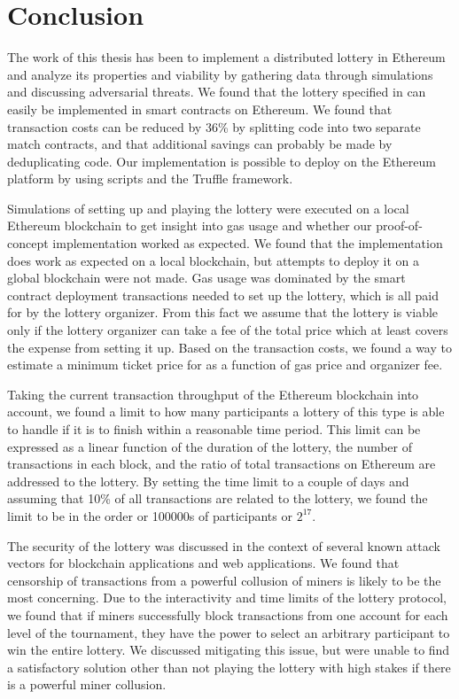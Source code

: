 \chapter{Conclusion}
\label{chap:conclusion}


The work of this thesis has been to implement a distributed lottery in Ethereum and analyze its properties and viability by gathering data through simulations and discussing adversarial threats. We found that the lottery specified in \cite{miller_zero-collateral_2017} can easily be implemented in smart contracts on Ethereum. We found that transaction costs can be reduced by 36\% by splitting code into two separate match contracts, and that additional savings can probably be made by deduplicating code. Our implementation is possible to deploy on the Ethereum platform by using scripts and the Truffle framework.

Simulations of setting up and playing the lottery were executed on a local Ethereum blockchain to get insight into gas usage and whether our proof-of-concept implementation worked as expected. We found that the implementation does work as expected on a local blockchain, but attempts to deploy it on a global blockchain were not made. Gas usage was dominated by the smart contract deployment transactions needed to set up the lottery, which is all paid for by the lottery organizer. From this fact we assume that the lottery is viable only if the lottery organizer can take a fee of the total price which at least covers the expense from setting it up. Based on the transaction costs, we found a way to estimate a minimum ticket price for as a function of gas price and organizer fee.

Taking the current transaction throughput of the Ethereum blockchain into account, we found a limit to how many participants a lottery of this type is able to handle if it is to finish within a reasonable time period. This limit can be expressed as a linear function of the duration of the lottery, the number of transactions in each block, and the ratio of total transactions on Ethereum are addressed to the lottery. By setting the time limit to a couple of days and assuming that 10\% of all transactions are related to the lottery, we found the limit to be in the order or 100000s of participants or $2^{17}$.

The security of the lottery was discussed in the context of several known attack vectors for blockchain applications and web applications. We found that censorship of transactions from a powerful collusion of miners is likely to be the most concerning. Due to the interactivity and time limits of the lottery protocol, we found that if miners successfully block transactions from one account for each level of the tournament, they have the power to select an arbitrary participant to win the entire lottery.
We discussed mitigating this issue, but were unable to find a satisfactory solution other than not playing the lottery with high stakes if there is a powerful miner collusion. 

